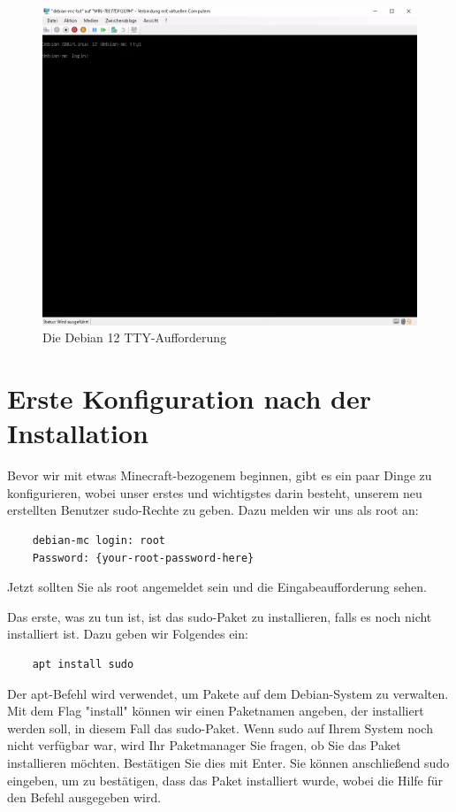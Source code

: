 \documentclass[]{article}
\begin{document}
\begin{figure}[h!]
    \caption{Die Debian 12 TTY-Aufforderung}
    \centering
    \includegraphics[width=1\textwidth]{tty}
\end{figure}
\FloatBarrier

\section{Erste Konfiguration nach der Installation}

Bevor wir mit etwas Minecraft-bezogenem beginnen, gibt es ein paar Dinge zu konfigurieren, wobei unser erstes und wichtigstes darin besteht, unserem neu erstellten Benutzer sudo-Rechte zu geben. Dazu melden wir uns als root an:

\begin{verbatim}
    debian-mc login: root
    Password: {your-root-password-here}
\end{verbatim}

Jetzt sollten Sie als root angemeldet sein und die Eingabeaufforderung sehen.

Das erste, was zu tun ist, ist das sudo-Paket zu installieren, falls es noch nicht installiert ist. Dazu geben wir Folgendes ein:

\begin{verbatim}
    apt install sudo
\end{verbatim}

Der apt-Befehl wird verwendet, um Pakete auf dem Debian-System zu verwalten. Mit dem Flag "install" können wir einen Paketnamen angeben, der installiert werden soll, in diesem Fall das sudo-Paket. Wenn sudo auf Ihrem System noch nicht verfügbar war, wird Ihr Paketmanager Sie fragen, ob Sie das Paket installieren möchten. Bestätigen Sie dies mit Enter. Sie können anschließend sudo eingeben, um zu bestätigen, dass das Paket installiert wurde, wobei die Hilfe für den Befehl ausgegeben wird.
\end{document}
